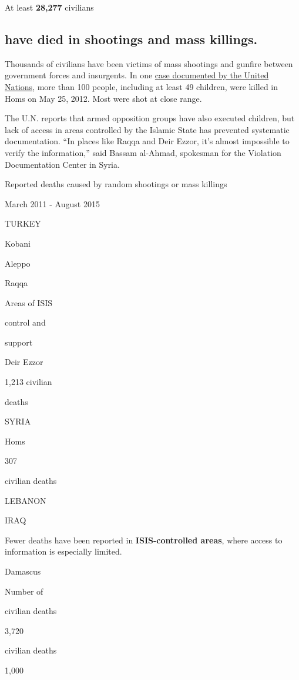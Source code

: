 At least \textbf{28,277} civilians

\hypertarget{have-died-in-shootings-and-mass-killings}{%
\subsection{have died in shootings and mass
killings.}\label{have-died-in-shootings-and-mass-killings}}

Thousands of civilians have been victims of mass shootings and gunfire
between government forces and insurgents. In one
\href{http://www.un.org/en/ga/search/view_doc.asp?symbol=S/2014/31}{case
documented by the United Nations}, more than 100 people, including at
least 49 children, were killed in Homs on May 25, 2012. Most were shot
at close range.

The U.N. reports that armed opposition groups have also executed
children, but lack of access in areas controlled by the Islamic State
has prevented systematic documentation. ``In places like Raqqa and Deir
Ezzor, it's almost impossible to verify the information,'' said Bassam
al-Ahmad, spokesman for the Violation Documentation Center in Syria.

Reported deaths caused by random shootings or mass killings

March 2011 - August 2015

TURKEY

Kobani

Aleppo

Raqqa

Areas of ISIS

control and

support

Deir Ezzor

1,213 civilian

deaths

SYRIA

Homs

307

civilian deaths

LEBANON

IRAQ

Fewer deaths have been reported in \textbf{ISIS-controlled areas}, where
access to information is especially limited.

Damascus

Number of

civilian deaths

3,720

civilian deaths

1,000


